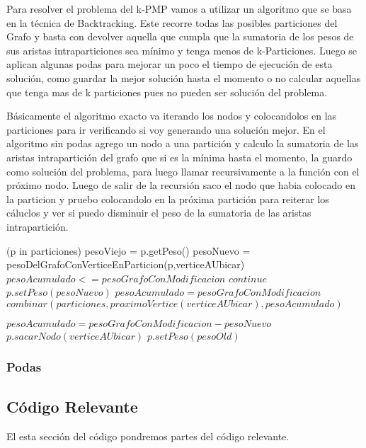 Para resolver el problema del k-PMP vamos a utilizar un algoritmo que se basa en la t\'ecnica de Backtracking. Este recorre todas las posibles particiones del Grafo y basta con devolver aquella que cumpla que la sumatoria de los pesos de sus aristas intraparticiones sea m\'inimo y tenga menos de k-Particiones.
Luego se aplican algunas podas para mejorar un poco el tiempo de ejecuci\'on de esta soluci\'on, como guardar la mejor soluci\'on hasta el momento o no calcular aquellas que tenga mas de k particiones pues no pueden ser soluci\'on del problema.

Básicamente el algoritmo exacto va iterando los nodos y colocandolos en las particiones para ir verificando si voy generando una solución mejor. En el algoritmo sin podas agrego un nodo a una partición y calculo la sumatoria de las aristas intrapartición del grafo que si es la mínima hasta el momento, la guardo como solución del problema, para luego llamar recursivamente a la función con el próximo nodo. Luego de salir de la recursión saco el nodo que habia colocado en la particion y pruebo colocandolo en la próxima partición para reiterar los cáluclos y ver si puedo disminuir el peso de la sumatoria de las aristas intrapartición.

\begin{codebox}
  \li \For (p in particiones)
  \li   pesoViejo = p.getPeso()
  \li   pesoNuevo = pesoDelGrafoConVerticeEnParticion(p,verticeAUbicar)
      \End
  \li   \If $pesoAcumulado <= pesoGrafoConModificacion$
  \li   \Then
          $continue$
  \li   \Else
  \li     $p.setPeso(pesoNuevo)$
  \li     $pesoAcumulado = pesoGrafoConModificacion$
  \li     $combinar(particiones, proximoVertice(verticeAUbicar), pesoAcumulado)$

  \li     $pesoAcumulado = pesoGrafoConModificacion - pesoNuevo$
  \li     $p.sacarNodo(verticeAUbicar)$
  \li     $p.setPeso(pesoOld)$

        \End
\end{codebox}

\subsubsection{Podas}




\subsection{C\'odigo Relevante}
El esta secci\'on del c\'odigo pondremos partes del c\'odigo relevante.

